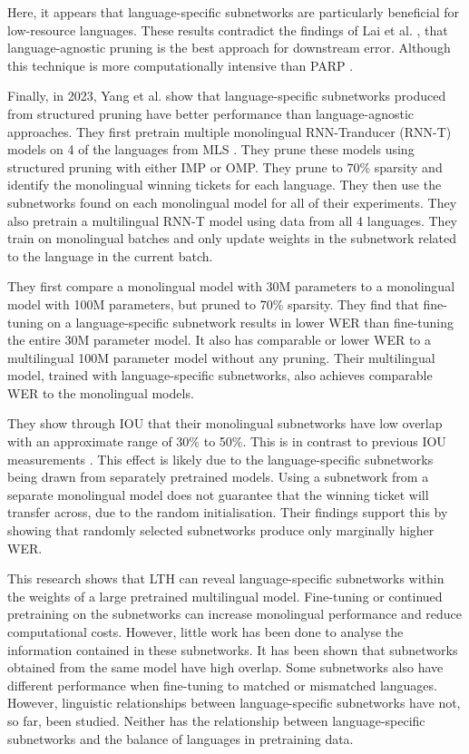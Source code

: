 Here, it appears that language-specific subnetworks are particularly beneficial for low-resource languages. These results contradict the findings of Lai et al. \cite{PARP}, that language-agnostic pruning is the best approach for downstream error. Although this technique is more computationally intensive than PARP \cite{PARP, Lu_Language_adap_xlsr}.

Finally, in 2023, Yang et al. \cite{yang2023learning} show that language-specific subnetworks produced from structured pruning have better performance than language-agnostic approaches. They first pretrain multiple monolingual RNN-Tranducer (RNN-T) \cite{graves2012rnnt} models on 4 of the languages from MLS \cite{MLS}. They prune these models using structured pruning with either IMP or OMP. They prune to 70\% sparsity and identify the monolingual winning tickets for each language. They then use the subnetworks found on each monolingual model for all of their experiments. They also pretrain a multilingual RNN-T model using data from all 4 languages. They train on monolingual batches and only update weights in the subnetwork related to the language in the current batch.

They first compare a monolingual model with 30M parameters to a monolingual model with 100M parameters, but pruned to 70\% sparsity. They find that fine-tuning on a language-specific subnetwork results in lower WER than fine-tuning the entire 30M parameter model. It also has comparable or lower WER to a multilingual 100M parameter model without any pruning. Their multilingual model, trained with language-specific subnetworks, also achieves comparable WER to the monolingual models. 

They show through IOU that their monolingual subnetworks have low overlap with an approximate range of 30\% to 50\%. This is in contrast to previous IOU measurements \cite{PARP}. This effect is likely due to the language-specific subnetworks being drawn from separately pretrained models. Using a subnetwork from a separate monolingual model does not guarantee that the winning ticket will transfer across, due to the random initialisation. Their findings support this by showing that randomly selected subnetworks produce only marginally higher WER.

This research shows that LTH can reveal language-specific subnetworks within the weights of a large pretrained multilingual model. Fine-tuning or continued pretraining on the subnetworks can increase monolingual performance and reduce computational costs. However, little work has been done to analyse the information contained in these subnetworks. It has been shown that subnetworks obtained from the same model have high overlap. Some subnetworks also have different performance when fine-tuning to matched or mismatched languages. However, linguistic relationships between language-specific subnetworks have not, so far, been studied. Neither has the relationship between language-specific subnetworks and the balance of languages in pretraining data. 

